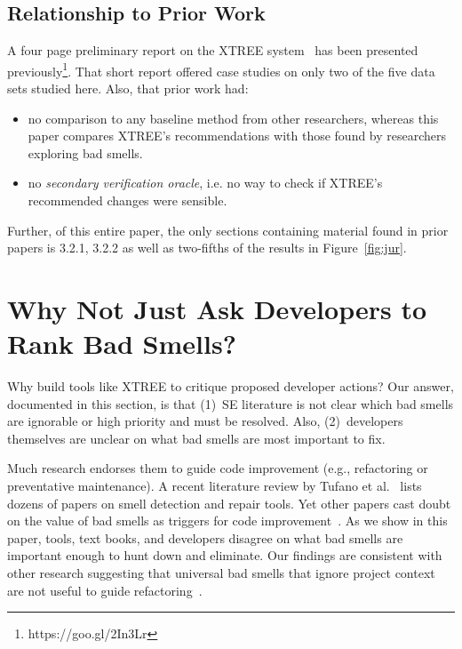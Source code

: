 \documentclass[twocolumn,5p]{elsarticle}
\newcommand{\bi}{\begin{itemize}[leftmargin=0.4cm]}
\newcommand{\ei}{\end{itemize}}
\newcommand{\fig}[1]{Figure~\ref{fig:#1}}
\theoremstyle{break}
\begin{document}
  \subsection{Relationship to Prior Work }
A four page preliminary report on the XTREE system~\cite{krishna2015actionable} has been presented previously\footnote{https://goo.gl/2In3Lr}. That short report offered case studies on only two  of
the five data sets studied here. Also, that prior work had:
\bi
\item
no comparison to any baseline
method from other researchers, whereas this paper compares XTREE's recommendations
with those found by researchers exploring bad smells.
\item
no {\em secondary verification oracle}, i.e. no way to check if XTREE's recommended changes were sensible.
\ei
Further, of this entire paper, the only sections containing material
found in prior papers is 3.2.1, 3.2.2 as well as two-fifths of the results in \fig{jur}. 



\section{Why Not Just Ask Developers to Rank Bad Smells?}\label{sect:prelim}

Why build tools like XTREE to  critique proposed developer actions?
Our answer, documented in this section, is that (1)~SE literature is not clear which bad smells are ignorable or  high priority and must be resolved.
Also, (2)~developers themselves are unclear on what bad smells are most important to fix.
 
 
Much research endorses them to guide
code improvement (e.g., refactoring or preventative maintenance). A recent literature review by Tufano et al.~\cite{Tufano2015}  
lists dozens of papers on smell detection and repair tools. 
Yet
other papers cast doubt on the value of bad smells
as triggers for code improvement~\cite{Mantyla2004,Yamashita2013,Sjoberg2013}. 
As we show in this paper,  
 tools, text books, and developers disagree on what bad smells
are important enough to hunt down and eliminate. Our findings
are consistent with other research suggesting that universal bad
smells that ignore project context are not useful to guide refactoring~\cite{Mantyla2004,Yamashita2013,Sjoberg2013}.
\end{document}
